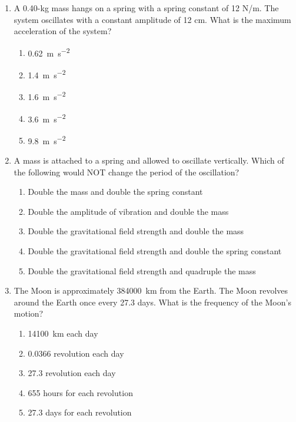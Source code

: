 \documentclass{../../../oss-classkick}
\begin{document}
\genheader


\genmultidirections

\gengravity

\raggedcolumns
\begin{multicols}{2}
  \begin{enumerate}[leftmargin=18pt]

  \item A 0.40-kg mass hangs on a spring with a spring constant of 12 N/m.
    The system oscillates with a constant amplitude of 12 cm. What is the
    maximum acceleration of the system?
    \begin{enumerate}[nosep,leftmargin=18pt,label=(\Alph*)]
    \item\SI{.62}{\metre\per\second\squared}
    \item\SI{1.4}{\metre\per\second\squared}
    \item\SI{1.6}{\metre\per\second\squared}
    \item\SI{3.6}{\metre\per\second\squared}
    \item\SI{9.8}{\metre\per\second\squared}
    \end{enumerate}

  \item A mass is attached to a spring and allowed to oscillate vertically.
    Which of the following would NOT change the period of the oscillation?
    \begin{enumerate}[nosep,leftmargin=18pt,label=(\Alph*)]
    \item Double the mass and double the spring constant
    \item Double the amplitude of vibration and double the mass
    \item Double the gravitational field strength and double the mass
    \item Double the gravitational field strength and double the spring constant
    \item Double the gravitational field strength and quadruple the mass
    \end{enumerate}
    \vspace{.7in}
    
  \item The Moon is approximately \SI{384000}{\kilo\metre} from the Earth. The
    Moon revolves around the Earth once every 27.3 days. What is the frequency
    of the Moon's motion?
    \begin{enumerate}[nosep,leftmargin=18pt,label=(\Alph*)]
    \item \SI{14100}{\kilo\metre} each day
    \item 0.0366 revolution each day
    \item 27.3 revolution each day
    \item 655 hours for each revolution
    \item 27.3 days for each revolution
    \end{enumerate}
    \vspace{.7in}
    

\end{enumerate}
\end{multicols}
\end{document}
